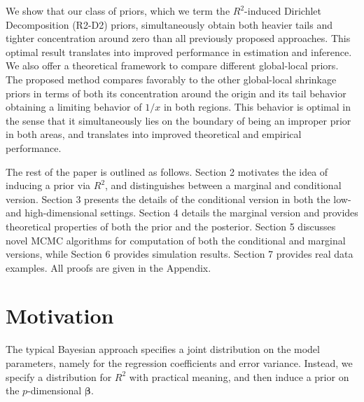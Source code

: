 \documentclass[12pt]{article}
\begin{document}
We show that our class of priors, which we term the $R^2$-induced Dirichlet Decomposition   (R2-D2) priors, simultaneously obtain both heavier tails and tighter concentration around zero than all previously proposed approaches. This optimal result translates into improved performance in estimation and inference. We also  offer a theoretical framework to compare different global-local priors.
 The  proposed    method  compares favorably to  the other global-local shrinkage priors
 in terms of both its concentration around the origin and its tail behavior obtaining a limiting behavior of $1/x$ in both regions. This behavior is optimal in the sense that it simultaneously lies on the boundary of being an improper prior in both areas, and translates into improved theoretical and empirical performance.


 The rest of the paper is outlined as follows. Section 2 motivates the idea of inducing a prior via $R^2$, and distinguishes between a marginal and conditional version. Section 3 presents the details of the conditional version in both the low- and high-dimensional settings. Section 4 details the marginal version and provides theoretical properties of both the prior and the  posterior. Section 5 discusses novel MCMC algorithms for computation of both the conditional and marginal versions, while Section 6 provides simulation results. Section 7  provides real data examples.
All proofs are given in the Appendix.



\section{Motivation}

The typical Bayesian approach specifies a joint distribution on the model parameters, namely for the regression coefficients and error variance.
Instead, we specify a distribution for $R^2$ with practical meaning,   and  then induce  a prior on the $p$-dimensional $ \bm{\beta}$.

\end{document}
